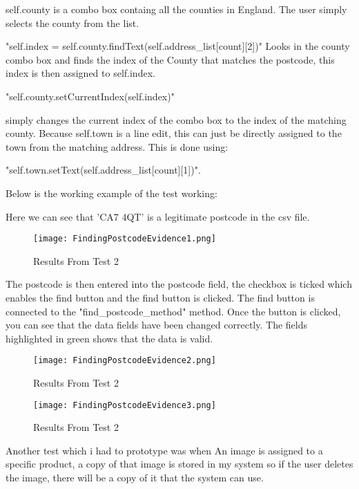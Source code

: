 self.county is a combo box containg all the counties in England. The user simply selects the county from the list. \begin{python}"self.index = self.county.findText(self.address_list[count][2])" Looks in the county combo box and finds the index of the County that matches the postcode, this index is then assigned to self.index.\begin{python}  "self.county.setCurrentIndex(self.index)" \end{python}simply changes the current index of the combo box to the index of the matching county. Because self.town is a line edit, this can just be directly assigned to the town from the matching address. This is done using:\begin{python}"self.town.setText(self.address_list[count][1])".\end{python} Below is the working example of the test working:

Here we can see that 'CA7 4QT' is a legitimate postcode in the csv file.

\begin{figure}[H]
\caption{Results From Test 2} \label{fig:Results From Test 2}
\hfill\texttt{[image: FindingPostcodeEvidence1.png]}\hspace*{\fill}
\end{figure}

The postcode is then entered into the postcode field, the checkbox is ticked which enables the find button and the find button is clicked. The find button is connected to the "find_postcode_method" method. Once the button is clicked, you can see that the data fields have been changed correctly. The fields highlighted in green shows that the data is valid.

\begin{figure}[H]
\caption{Results From Test 2} \label{fig:Results From Test 2}
\hfill\texttt{[image: FindingPostcodeEvidence2.png]}\hspace*{\fill}
\end{figure}

\begin{figure}[H]
\caption{Results From Test 2} \label{fig:Results From Test 2}
\hfill\texttt{[image: FindingPostcodeEvidence3.png]}\hspace*{\fill}
\end{figure}

Another test which i had to prototype was when An image is assigned to a specific product, a copy of that image is stored in my system so if the user deletes the image, there will be a copy of it that the system can use. 


\end{python}
